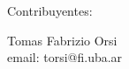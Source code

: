 \documentclass{article}
\begin{document}
\begin{titlepage}
  \vspace{0.2cm}
  \begin{center}
    {\Large{Contribuyentes:}}\\
    \vspace{0.6cm}
    {\begin{minipage}{.5\textwidth}
        \begin{center}
          Tomas Fabrizio Orsi\\
          {\small{email: torsi@fi.uba.ar}}
        \end{center}
      \end{minipage}}
  \end{center}
\end{titlepage}
\end{document}
